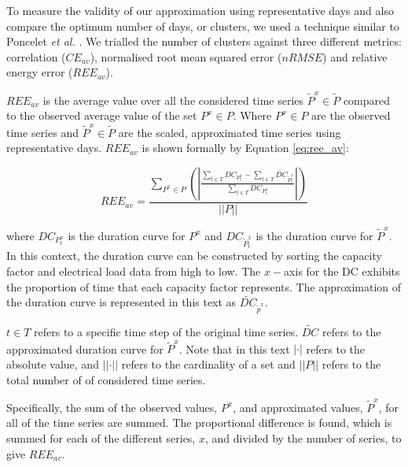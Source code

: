 To measure the validity of our approximation using representative days and also compare the optimum number of days, or clusters, we used a technique similar to Poncelet \textit{et al.} \cite{Dhaeseleer2015, Poncelet2017}. We trialled the number of clusters against three different metrics: correlation ($CE_{av}$), normalised root mean squared error ($nRMSE$) and relative energy error ($REE_{av}$). 

$REE_{av}$ is the average value over all the considered time series $\widetilde{P}^x{\in} \widetilde{P}$ compared to the observed average value of the set $P^x\in P$. Where $P^x\in P$ are the observed time series and $\widetilde{P}^x{\in} \widetilde{P}$ are the scaled, approximated time series using representative days. $REE_{av}$ is shown formally by Equation \ref{eq:ree_av}:


\begin{equation}
\label{eq:ree_av}
REE_{av}=\frac
{\sum\limits_{P^x{\in} P}\left(\left|
	\frac
	{\sum\limits_{t\in T}DC_{P^x_t}-\sum\limits_{t\in T}\widetilde{DC}_{\widetilde{P}^x_t}}
	{\sum\limits_{t\in T}DC_{P^x_t}}
	\right|\right)
}
{\left|\left|P\right|\right|}
\end{equation}

\noindent where $DC_{P^x_t}$ is the duration curve for $P^x$ and $DC_{\widetilde{P}^x_t}$ is the duration curve for $\widetilde{P}^x$. In this context, the duration curve can be constructed by sorting the capacity factor and electrical load data from high to low. The $x-$axis for the DC exhibits the proportion of time that each capacity factor represents. The approximation of the duration curve is represented in this text as $\widetilde{DC}_{\widetilde{p}^x}$.

$t\in T$ refers to a specific time step of the original time series. $\widetilde{DC}$ refers to the approximated duration curve for $\widetilde{P}^x$. Note that in this text $\left|\cdot\right|$ refers to the absolute value, and $\left|\left|\cdot\right|\right|$ refers to the cardinality of a set and $\left|\left|P\right|\right|$ refers to the total number of of considered time series.

Specifically, the sum of the observed values, $P^x$, and approximated values, $\widetilde P^x$, for all of the time series are summed. The proportional difference is found, which is summed for each of the different series, $x$, and divided by the number of series, to give $REE_{av}$.





